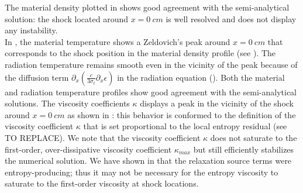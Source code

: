 \documentclass[times,doublespace]{fldauth}%
\begin{document}
%
%
The material density plotted in  shows good agreement with the semi-analytical solution: the shock located around $x=0 \ cm$ is well resolved and does not display any instability. \\
%
%
In , the material temperature shows a Zeldovich's peak around $x=0 \ cm$ that corresponds to the shock position in the material density profile (see ). The radiation temperature remains smooth even in the vicinity of the peak because of the diffusion term $ \partial_x \left( \frac{c}{3 \sigma_t} \partial_x \epsilon \right)$ in the radiation equation (). Both the material and radiation temperature profiles show good agreement with the semi-analytical solutions.
%
%
The viscosity coefficients $\kappa$ displays a peak in the vicinity of the shock around $x=0 \ cm$ as shown in : this behavior is conformed to the definition of the viscosity coefficient $\kappa$ that is set proportional to the local entropy residual (see TO REPLACE). We note that the viscosity coefficient $\kappa$ does not saturate to the first-order, over-dissipative viscosity coefficient $\kappa_{max}$ but still efficiently stabilizes the numerical solution. We have shown
in  that the relaxation source terms were entropy-producing; thus it may not be necessary for the entropy viscosity to saturate to the first-order viscosity at shock locations.
%
\end{document}
